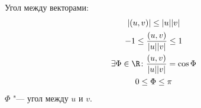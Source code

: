 \begin{Def}
	Угол между векторами:
	\begin{gather*}
		|(u, v)| \le |u||v| \\
		-1 \le \frac{(u, v)}{|u||v|} \le 1 \\
		\exists \Phi \in \R\colon \frac{(u,v)}{|u||v|} = \cos \Phi \\
		0 \le \Phi \le \pi
	\end{gather*}
	$\Phi$ "--- угол между $u$ и $v$.
\end{Def}
